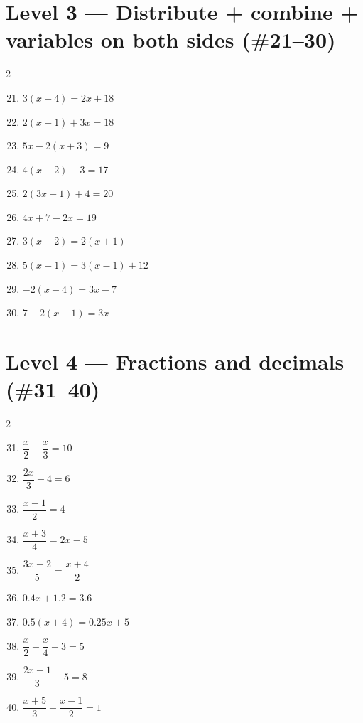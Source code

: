 \documentclass[11pt]{article}
\begin{document}
\section*{Level 3 \;—\; Distribute + combine + variables on both sides (\#21--30)}
\begin{multicols}{2}
\begin{enumerate}\setcounter{enumi}{20}
  \item $3(x + 4) = 2x + 18$
  \item $2(x - 1) + 3x = 18$
  \item $5x - 2(x + 3) = 9$
  \item $4(x + 2) - 3 = 17$
  \item $2(3x - 1) + 4 = 20$
  \item $4x + 7 - 2x = 19$
  \item $3(x - 2) = 2(x + 1)$
  \item $5(x + 1) = 3(x - 1) + 12$
  \item $-2(x - 4) = 3x - 7$
  \item $7 - 2(x + 1) = 3x$
\end{enumerate}
\end{multicols}

\section*{Level 4 \;—\; Fractions and decimals (\#31--40)}
\begin{multicols}{2}
\begin{enumerate}\setcounter{enumi}{30}
  \item $\dfrac{x}{2} + \dfrac{x}{3} = 10$
  \item $\dfrac{2x}{3} - 4 = 6$
  \item $\dfrac{x - 1}{2} = 4$
  \item $\dfrac{x + 3}{4} = 2x - 5$
  \item $\dfrac{3x - 2}{5} = \dfrac{x + 4}{2}$
  \item $0.4x + 1.2 = 3.6$
  \item $0.5(x + 4) = 0.25x + 5$
  \item $\dfrac{x}{2} + \dfrac{x}{4} - 3 = 5$
  \item $\dfrac{2x - 1}{3} + 5 = 8$
  \item $\dfrac{x + 5}{3} - \dfrac{x - 1}{2} = 1$
\end{enumerate}
\end{multicols}
\end{document}
